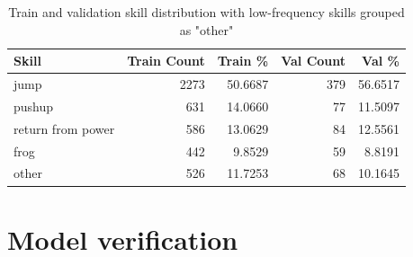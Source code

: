 \begin{table}[h!]
    \centering
    \begin{tabular}{|l|r|r|r|r|}
        \hline
        \textbf{Skill} & \textbf{Train Count} & \textbf{Train \%} & \textbf{Val Count} & \textbf{Val \%} \\
        \hline
        jump & 2273 & 50.6687 & 379 & 56.6517 \\
        pushup & 631 & 14.0660 & 77 & 11.5097 \\
        return from power & 586 & 13.0629 & 84 & 12.5561 \\
        frog & 442 & 9.8529 & 59 & 8.8191 \\
        other & 526 & 11.7253 & 68 & 10.1645 \\
        \hline
    \end{tabular}
    \caption{Train and validation skill distribution with low-frequency skills grouped as "other"}
    \label{tab:skill_distribution_grouped_final}
\end{table}


\section{Model verification}